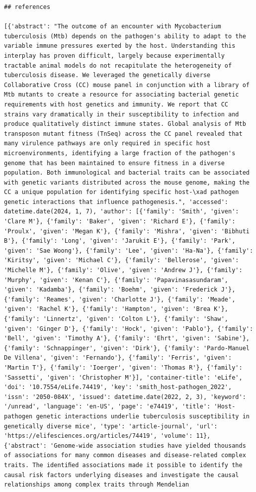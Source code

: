 \documentclass[
  12pt,
]
{article}
\begin{document}
\begin{verbatim}
## references

[{'abstract': "The outcome of an encounter with Mycobacterium tuberculosis (Mtb) depends on the pathogen's ability to adapt to the variable immune pressures exerted by the host. Understanding this interplay has proven difficult, largely because experimentally tractable animal models do not recapitulate the heterogeneity of tuberculosis disease. We leveraged the genetically diverse Collaborative Cross (CC) mouse panel in conjunction with a library of Mtb mutants to create a resource for associating bacterial genetic requirements with host genetics and immunity. We report that CC strains vary dramatically in their susceptibility to infection and produce qualitatively distinct immune states. Global analysis of Mtb transposon mutant fitness (TnSeq) across the CC panel revealed that many virulence pathways are only required in specific host microenvironments, identifying a large fraction of the pathogen's genome that has been maintained to ensure fitness in a diverse population. Both immunological and bacterial traits can be associated with genetic variants distributed across the mouse genome, making the CC a unique population for identifying specific host-\xad pathogen genetic interactions that influence pathogenesis.", 'accessed': datetime.date(2024, 1, 7), 'author': [{'family': 'Smith', 'given': 'Clare M'}, {'family': 'Baker', 'given': 'Richard E'}, {'family': 'Proulx', 'given': 'Megan K'}, {'family': 'Mishra', 'given': 'Bibhuti B'}, {'family': 'Long', 'given': 'Jarukit E'}, {'family': 'Park', 'given': 'Sae Woong'}, {'family': 'Lee', 'given': 'Ha-Na'}, {'family': 'Kiritsy', 'given': 'Michael C'}, {'family': 'Bellerose', 'given': 'Michelle M'}, {'family': 'Olive', 'given': 'Andrew J'}, {'family': 'Murphy', 'given': 'Kenan C'}, {'family': 'Papavinasasundaram', 'given': 'Kadamba'}, {'family': 'Boehm', 'given': 'Frederick J'}, {'family': 'Reames', 'given': 'Charlotte J'}, {'family': 'Meade', 'given': 'Rachel K'}, {'family': 'Hampton', 'given': 'Brea K'}, {'family': 'Linnertz', 'given': 'Colton L'}, {'family': 'Shaw', 'given': 'Ginger D'}, {'family': 'Hock', 'given': 'Pablo'}, {'family': 'Bell', 'given': 'Timothy A'}, {'family': 'Ehrt', 'given': 'Sabine'}, {'family': 'Schnappinger', 'given': 'Dirk'}, {'family': 'Pardo-Manuel De Villena', 'given': 'Fernando'}, {'family': 'Ferris', 'given': 'Martin T'}, {'family': 'Ioerger', 'given': 'Thomas R'}, {'family': 'Sassetti', 'given': 'Christopher M'}], 'container-title': 'eLife', 'doi': '10.7554/eLife.74419', 'key': 'smith_host-pathogen_2022', 'issn': '2050-084X', 'issued': datetime.date(2022, 2, 3), 'keyword': '/unread', 'language': 'en-US', 'page': 'e74419', 'title': 'Host-pathogen genetic interactions underlie tuberculosis susceptibility in genetically diverse mice', 'type': 'article-journal', 'url': 'https://elifesciences.org/articles/74419', 'volume': 11}, {'abstract': 'Genome-wide association studies have yielded thousands of associations for many common diseases and disease-related complex traits. The identiﬁed associations made it possible to identify the causal risk factors underlying diseases and investigate the causal relationships among complex traits through Mendelian 
\end{verbatim}
\end{document}
